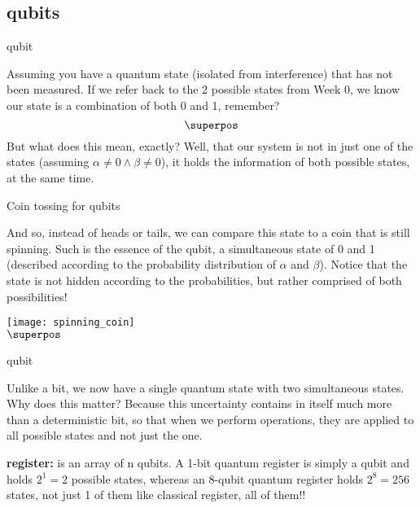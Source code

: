 \documentclass[aspectratio=43]{beamer}
\begin{document}
\subsection{qubits}
\begin{frame}{qubit}
    \begin{card}
    Assuming you have a quantum state (isolated from interference) that has not been measured. If we refer back to the 2 possible states from Week 0, we know our state is a combination of both 0 and 1, remember? \begin{equation*}
        \superpos
    \end{equation*}
    But what does this mean, exactly? Well, that our system is not in just one of the states (assuming $\alpha \neq 0 \wedge \beta \neq 0$), it holds the information of both possible states, at the same time.
    \end{card}
\pagenumber
\end{frame}

\begin{frame}{Coin tossing for qubits}
    \begin{card}
        And so, instead of heads or tails, we can compare this state to a coin that is still spinning. Such is the essence of the qubit, a simultaneous state of 0 and 1 (described according to the probability distribution of $\alpha$ and $\beta$).  Notice that the state is not hidden according to the probabilities, but rather comprised of both possibilities!  
    \end{card}
    \begin{center}
        \texttt{[image: spinning\_coin]}
        \\$\superpos$
    \end{center}
\pagenumber
\end{frame}

\begin{frame}{qubit}
    \begin{card}
        Unlike a bit, we now have a single quantum state with two simultaneous states. Why does this matter? Because this uncertainty contains in itself much more than a deterministic bit, so that when we perform operations, they are applied to all possible states and not just the one.
    \end{card}
	\begin{cardTiny}
		\textbf{\q register:} is an array of n qubits. A 1-bit quantum register is simply a qubit and holds $2^1 = 2$ possible states, whereas an 8-qubit quantum register holds $2^8 = 256$ states, not just 1 of them like classical register, all of them!!
	\end{cardTiny}
\pagenumber
\end{frame}
\end{document}

